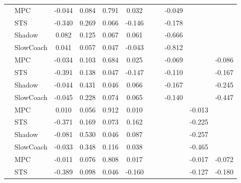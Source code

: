\begin{tabular}{|l|l|*{9}{c|}}
\midrule
[True, True, True, True, False, False, True, False, False] & MPC &   -0.044 &     0.084 &     0.791 &  0.032 &     &     &  -0.049 &      &       \\
                                                           & STS &   -0.340 &     0.269 &     0.066 & -0.146 &     &     &  -0.178 &      &       \\
                                                           & Shadow &    0.082 &     0.125 &     0.067 &  0.061 &     &     &  -0.666 &      &       \\
                                                           & SlowCoach &    0.041 &     0.057 &     0.047 & -0.043 &     &     &  -0.812 &      &       \\
\midrule
[True, True, True, True, False, False, True, False, True] & MPC &   -0.034 &     0.103 &     0.684 &  0.025 &     &     &  -0.069 &      &   -0.086 \\
                                                           & STS &   -0.391 &     0.138 &     0.047 & -0.147 &     &     &  -0.110 &      &   -0.167 \\
                                                           & Shadow &   -0.044 &     0.431 &     0.046 &  0.066 &     &     &  -0.167 &      &   -0.245 \\
                                                           & SlowCoach &   -0.045 &     0.228 &     0.074 &  0.065 &     &     &  -0.140 &      &   -0.447 \\
\midrule
[True, True, True, True, False, False, False, True, False] & MPC &    0.010 &     0.056 &     0.912 &  0.010 &     &     &      &  -0.013 &       \\
                                                           & STS &   -0.371 &     0.169 &     0.073 &  0.162 &     &     &      &  -0.225 &       \\
                                                           & Shadow &   -0.081 &     0.530 &     0.046 &  0.087 &     &     &      &  -0.257 &       \\
                                                           & SlowCoach &   -0.033 &     0.348 &     0.116 &  0.038 &     &     &      &  -0.465 &       \\
\midrule
[True, True, True, True, False, False, False, True, True] & MPC &   -0.011 &     0.076 &     0.808 &  0.017 &     &     &      &  -0.017 &   -0.072 \\
                                                           & STS &   -0.389 &     0.098 &     0.046 & -0.160 &     &     &      &  -0.127 &   -0.180 \\

\end{tabular}
